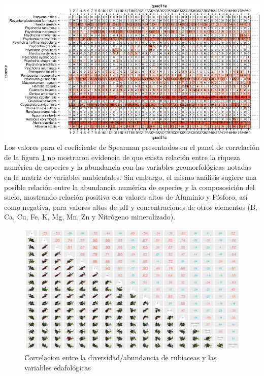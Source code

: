 \documentclass[11pt,]{article}
\begin{document}
\includegraphics{manuscrito_files/figure-latex/unnamed-chunk-3-1.pdf}
Los valores para el coeficiente de Spearman presentados en el panel de
correlación de la figura \ref{fig:panel_cor_suelo_abun_riq_rubic} no
mostraron evidencia de que exista relación entre la riqueza numérica de
especies y la abundancia con las variables geomorfológicas notadas en la
matríz de variables ambientales. Sin embargo, el mismo análisis sugiere
una posible relación entre la abundancia numérica de especies y la
compososición del suelo, mostrando relación positiva con valores altos
de Aluminio y Fósforo, así como negativa, para valores altos de pH y
concentraciones de otros elementos (B, Ca, Cu, Fe, K, Mg, Mn, Zn y
Nitrógeno mineralizado).

\begin{figure}
\centering
\includegraphics{panel_cor_suelo_abun_riq_rubic_spear.png}
\caption{Correlacion entre la diversidad/abundancia de rubiaceas y las
variables edafológicas \label{fig:panel_cor_suelo_abun_riq_rubic}}
\end{figure}
\end{document}
